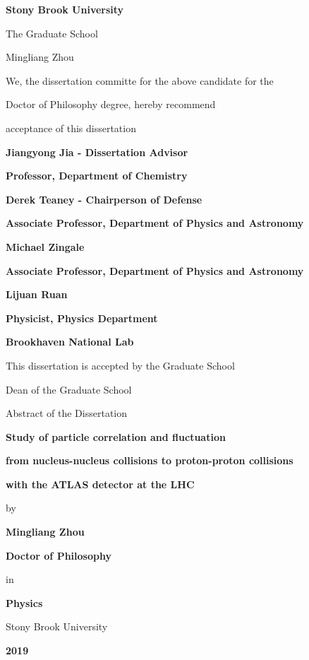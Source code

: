 \documentclass[12pt]{article}
\begin{document}
\centerline{\bf{Stony Brook University}}
\vspace*{1\baselineskip}
\centerline{The Graduate School}
\vspace*{2\baselineskip}
\centerline{Mingliang Zhou}
\vspace*{2\baselineskip}
\centerline{We, the dissertation committe for the above candidate for the}
\vspace*{1\baselineskip}
\centerline{Doctor of Philosophy degree, hereby recommend}
\vspace*{1\baselineskip}
\centerline{acceptance of this dissertation}
\vspace*{2\baselineskip}
\centerline{\bf{Jiangyong Jia - Dissertation Advisor}}
\centerline{\bf{Professor, Department of Chemistry}}
\vspace*{2\baselineskip}
\centerline{\bf{Derek Teaney - Chairperson of Defense}}
\centerline{\bf{Associate Professor, Department of Physics and Astronomy}}
\vspace*{2\baselineskip}
\centerline{\bf{Michael Zingale}}
\centerline{\bf{Associate Professor, Department of Physics and Astronomy}} 
\vspace*{2\baselineskip}
\centerline{\bf{Lijuan Ruan}}
\centerline{\bf{Physicist, Physics Department}}
\centerline{\bf{Brookhaven National Lab}}
\vspace*{2\baselineskip}
\centerline{This dissertation is accepted by the Graduate School}
\vspace*{3\baselineskip}
\centerline{Dean of the Graduate School}

\newpage

\centerline{Abstract of the Dissertation}
\vspace*{1\baselineskip}
\centerline{\bf{Study of particle correlation and fluctuation}}
\centerline{\bf{from nucleus-nucleus collisions to proton-proton collisions}}
\centerline{\bf{with the ATLAS detector at the LHC}}
\vspace*{1\baselineskip}
\centerline{by}
\vspace*{1\baselineskip}
\centerline{\bf{Mingliang Zhou}}
\vspace*{1\baselineskip}
\centerline{\bf{Doctor of Philosophy}}
\vspace*{1\baselineskip}
\centerline{in}
\vspace*{1\baselineskip}
\centerline{\bf{Physics}}
\vspace*{1\baselineskip}
\centerline{Stony Brook University}
\vspace*{1\baselineskip}
\centerline{\bf{2019}}
\vspace*{2\baselineskip}
\end{document}
